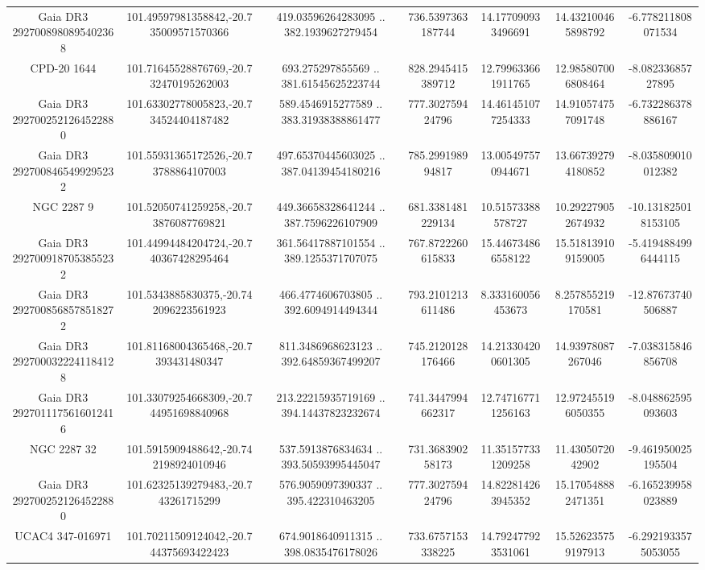 \begin{table}
\begin{tabular}{ccccccc}
Gaia DR3 2927008980895402368 & 101.49597981358842,-20.735009571570366 & 419.03596264283095 .. 382.1939627279454 & 736.5397363187744 & 14.177090933496691 & 14.432100465898792 & -6.778211808071534 \\
CPD-20  1644 & 101.71645528876769,-20.732470195262003 & 693.275297855569 .. 381.61545625223744 & 828.2945415389712 & 12.799633661911765 & 12.985807006808464 & -8.08233685727895 \\
Gaia DR3 2927002521264522880 & 101.63302778005823,-20.734524404187482 & 589.4546915277589 .. 383.31938388861477 & 777.302759424796 & 14.461451077254333 & 14.910574757091748 & -6.732286378886167 \\
Gaia DR3 2927008465499295232 & 101.55931365172526,-20.73788864107003 & 497.65370445603025 .. 387.04139454180216 & 785.299198994817 & 13.005497570944671 & 13.667392794180852 & -8.035809010012382 \\
NGC  2287     9 & 101.52050741259258,-20.73876087769821 & 449.36658328641244 .. 387.7596226107909 & 681.3381481229134 & 10.51573388578727 & 10.292279052674932 & -10.131825018153105 \\
Gaia DR3 2927009187053855232 & 101.44994484204724,-20.740367428295464 & 361.56417887101554 .. 389.1255371707075 & 767.8722260615833 & 15.446734866558122 & 15.518139109159005 & -5.4194884996444115 \\
Gaia DR3 2927008568578518272 & 101.5343885830375,-20.742096223561923 & 466.4774606703805 .. 392.6094914494344 & 793.2101213611486 & 8.333160056453673 & 8.257855219170581 & -12.87673740506887 \\
Gaia DR3 2927000322241184128 & 101.81168004365468,-20.7393431480347 & 811.3486968623123 .. 392.64859367499207 & 745.2120128176466 & 14.213304200601305 & 14.93978087267046 & -7.038315846856708 \\
Gaia DR3 2927011175616012416 & 101.33079254668309,-20.744951698840968 & 213.22215935719169 .. 394.14437823232674 & 741.3447994662317 & 12.747167711256163 & 12.972455196050355 & -8.048862595093603 \\
NGC  2287    32 & 101.5915909488642,-20.742198924010946 & 537.5913876834634 .. 393.50593995445047 & 731.368390258173 & 11.351577331209258 & 11.4305072042902 & -9.461950025195504 \\
Gaia DR3 2927002521264522880 & 101.62325139279483,-20.743261715299 & 576.9059097390337 .. 395.422310463205 & 777.302759424796 & 14.822814263945352 & 15.170548882471351 & -6.165239958023889 \\
UCAC4 347-016971 & 101.70211509124042,-20.744375693422423 & 674.9018640911315 .. 398.0835476178026 & 733.6757153338225 & 14.792477923531061 & 15.526235759197913 & -6.2921933575053055 \\

\end{tabular}
\end{table}
